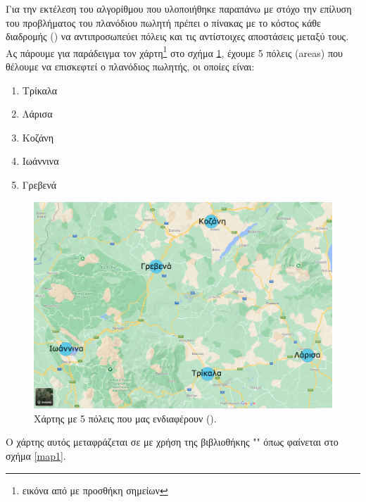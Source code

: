 Για την εκτέλεση του αλγορίθμου που υλοποιήθηκε παραπάνω με στόχο την επίλυση του προβλήματος του πλανόδιου πωλητή πρέπει ο πίνακας με το κόστος κάθε διαδρομής () να αντιπροσωπεύει πόλεις και τις αντίστοιχες αποστάσεις μεταξύ τους. Ας πάρουμε για παράδειγμα τον χάρτη\footnote{εικόνα από  με προσθήκη σημείων} στο σχήμα \ref{map2}, έχουμε 5 πόλεις (areas) που θέλουμε να επισκεφτεί ο πλανόδιος πωλητής, οι οποίες είναι:
\begin{enumerate}
    \item Τρίκαλα
    \item Λάρισα
    \item Κοζάνη
    \item Ιωάννινα
    \item Γρεβενά
\end{enumerate}
\begin{figure}
    \centering
    \includegraphics[scale=0.45]{2947_thesis/pictures/map2.png} 
    \caption{Χάρτης με 5 πόλεις που μας ενδιαφέρουν ().}
    \label{map2}
\end{figure}
Ο χάρτης αυτός μεταφράζεται σε  με χρήση της βιβλιοθήκης "" όπως φαίνεται στο σχήμα \ref{map1}.


